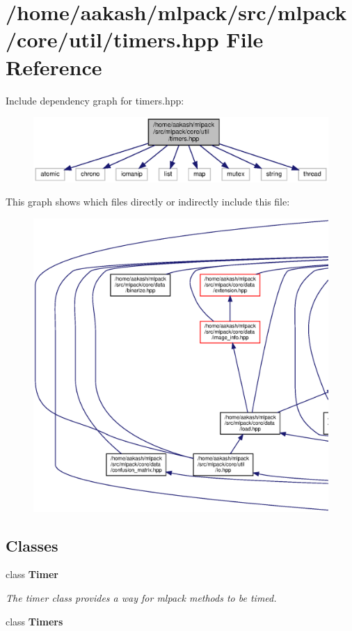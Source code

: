 \section{/home/aakash/mlpack/src/mlpack/core/util/timers.hpp File Reference}
\label{timers_8hpp}
Include dependency graph for timers.\+hpp\+:
\nopagebreak
\begin{figure}[H]
\begin{center}
\leavevmode
\includegraphics[width=350pt]{timers_8hpp__incl}
\end{center}
\end{figure}
This graph shows which files directly or indirectly include this file\+:
\nopagebreak
\begin{figure}[H]
\begin{center}
\leavevmode
\includegraphics[width=350pt]{timers_8hpp__dep__incl}
\end{center}
\end{figure}
\subsection*{Classes}
\begin{DoxyCompactItemize}
\item 
class \textbf{ Timer}
\begin{DoxyCompactList}\small\item\em The timer class provides a way for mlpack methods to be timed. \end{DoxyCompactList}\item 
class \textbf{ Timers}
\end{DoxyCompactItemize}
